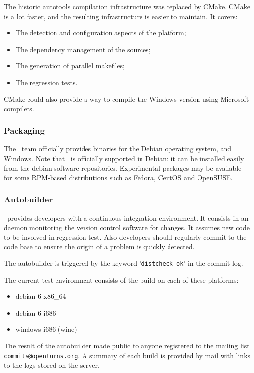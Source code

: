 The historic autotools compilation infrastructure was replaced by CMake. CMake is a lot faster, and the resulting infrastructure is easier to maintain. It covers:
\begin{itemize}
\item The detection and configuration aspects of the platform;
\item The dependency management of the sources;
\item The generation of parallel makefiles;
\item The regression tests.
\end{itemize}
CMake could also provide a way to compile the Windows version using Microsoft compilers.

\subsubsection{Packaging}

The \OT\ team officially provides binaries for the Debian operating system, and Windows.
Note that \OT\ is officially supported in Debian: it can be installed easily from the debian software repositories.
Experimental packages may be available for some RPM-based distributions such as Fedora, CentOS and OpenSUSE.

\subsubsection{Autobuilder}

\OT\ provides developers with a continuous integration environment.
It consists in an daemon monitoring the version control software for changes.
It assumes new code to be involved in regression test.
Also developers should regularly commit to the code base to ensure the origin of a problem is quickly detected.

The autobuilder is triggered by the keyword '\verb|distcheck ok|' in the commit log.

The current test environment consists of the build on each of these platforms:
\begin{itemize}
\item debian 6 x86\_64
\item debian 6 i686
\item windows i686 (wine)
\end{itemize}
The result of the autobuilder made public to anyone registered to the mailing list \verb|commits@openturns.org|.
A summary of each build is provided by mail with links to the logs stored on the server.

